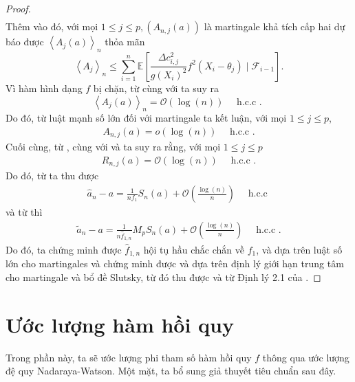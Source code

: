 \begin{proof}
\begin{align}
    \label{8.23}
\end{align}
Thêm vào đó, với mọi $1 \leq j \leq p,\left(A_{n, j}(a)\right)$ là martingale khả tích cấp hai dự báo được $\left\langle A_{j}(a)\right\rangle_{n}$ thỏa mãn
$$
\left\langle A_{j}\right\rangle_{n} \leq \sum_{i=1}^{n} \mathbb{E}\left[\frac{\Delta c_{i, j}^{2}}{g\left(X_{i}\right)^{2}} f^{2}\left(X_{i}-\theta_{j}\right) \mid \mathcal{F}_{i-1}\right].
$$
Vì hàm hình dạng $f$ bị chặn, từ  cùng với  ta suy ra
$$
\left\langle A_{j}(a)\right\rangle_{n}=\mathcal{O}(\log (n)) \quad \text { h.c.c . }
$$
Do đó, từ luật mạnh số lớn đối với martingale ta kết luận, với mọi $1 \leq j \leq p$,
\begin{align}
    A_{n, j}(a)=o(\log (n)) \quad \text { h.c.c .}
    \label{8.24}
\end{align}
Cuối cùng, từ ,  cùng với  và  ta suy ra rằng, với mọi $1 \leq j \leq p$
\begin{align}
    R_{n, j}(a)=\mathcal{O}(\log (n)) \quad \text { h.c.c .}
    \label{8.25}
\end{align}
Do đó, từ  ta thu được
\begin{align}
    \widehat{a}_{n}-a=\frac{1}{n f_{1}} S_{n}(a)+\mathcal{O}\left(\frac{\log (n)}{n}\right) \quad \text { h.c.c }
    \label{8.26}
\end{align}
và từ  thì
\begin{align}
    \widetilde{a}_{n}-a=\frac{1}{n \widehat{f}_{1, n}} M_{p} S_{n}(a)+\mathcal{O}\left(\frac{\log (n)}{n}\right) \quad \text { h.c.c .}
    \label{8.27}
\end{align}
Do đó, ta chứng minh được $\widehat{f}_{1, n}$ hội tụ hầu chắc chắn về $f_{1}$,  và  dựa trên luật số lớn cho martingales và chứng minh được  và  dựa trên định lý giới hạn trung tâm cho martingale và bổ đề Slutsky, từ đó thu được  và  từ Định lý 2.1 của \cite{chaabane} .
\end{proof}

\section{Ước lượng hàm hồi quy}
Trong phần này, ta sẽ ước lượng phi tham số hàm hồi quy $f$ thông qua ước lượng đệ quy Nadaraya-Watson. Một mặt, ta bổ sung giả thuyết tiêu chuẩn sau đây.

